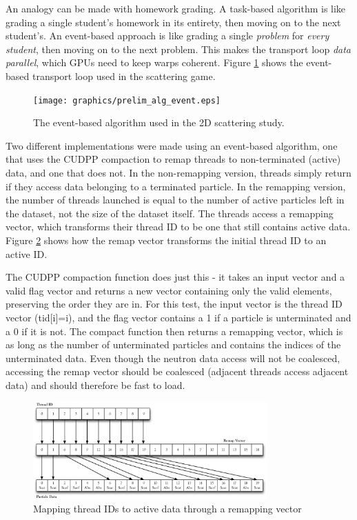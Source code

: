  An analogy can be made with homework grading.  A task-based algorithm is like grading a single student's homework in its entirety, then moving on to the next student's.  An event-based approach is like grading a single \emph{problem} for \emph{every student}, then moving on to the next problem.  This makes the transport loop \emph{data parallel}, which GPUs need to keep warps coherent.  Figure \ref{prelim_alg_event} shows the event-based transport loop used in the scattering game.

\begin{figure}[h!] 
  \centering
    \texttt{[image: graphics/prelim\_alg\_event.eps]}
     \caption{The event-based algorithm used in the 2D scattering study. \label{prelim_alg_event} }
\end{figure}%

Two different implementations were made using an event-based algorithm, one that uses the CUDPP compaction to remap threads to non-terminated (active) data, and one that does not.  In the non-remapping version, threads simply return if they access data belonging to a terminated particle.  In the remapping version, the number of threads launched is equal to the number of active particles left in the dataset, not the size of the dataset itself.  The threads access a remapping vector, which transforms their thread ID to be one that still contains active data.  Figure \ref{remapping} shows how the remap vector transforms the initial thread ID to an active ID.  

The CUDPP compaction function does just this - it takes an input vector and a valid flag vector and returns a new vector containing only the valid elements, preserving the order they are in.  For this test, the input vector is the thread ID vector (tid[i]=i), and the flag vector contains a 1 if a particle is unterminated and a 0 if it is not.  The compact function then returns a remapping vector, which is as long as the number of unterminated particles and contains the indices of the unterminated data.  Even though the neutron data access will not be coalesced, accessing the remap vector should be coalesced (adjacent threads access adjacent data) and should therefore be fast to load.

\begin{figure}[h!] 
  \centering
    \includegraphics[width=0.8\textwidth]{graphics/remapping_horiz.eps}
     \caption{Mapping thread IDs to active data through a remapping vector \label{remapping} }
\end{figure}

